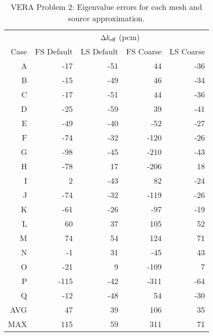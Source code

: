 {{{      \begin{table}[htbp]
        \centering
        \caption{VERA Problem 2: Eigenvalue errors for each mesh and source approximation.\label{tab:LSMOC:Lattice:Eigenvalue}}
        \small
        \begin{tabular}{rrrrr} \toprule
                     & \multicolumn{4}{c}{$\Delta k_{\text{eff}}$ (pcm)}\\\cline{2-5}
            Case     & FS Default & LS Default & FS Coarse & LS Coarse\\\midrule
                A    & -17  &   -51   &  44     & -36\\
                B    & -15  &   -49   &  46     & -34\\
                C    & -17  &   -51   &  44     & -36\\
                D    & -25  &   -59   &  39     & -41\\
                E    & -49  &   -40   &  -52    & -27\\
                F    & -74  &   -32   &  -120   & -26\\
                G    & -98  &   -45   &  -210   & -43\\
                H    & -78  &   17    &  -206   & 18 \\
                I    & 2    &   -43   &  82     & -24\\
                J    & -74  &   -32   &  -119   & -26\\
                K    & -61  &   -26   &  -97    & -19\\
                L    & 60   &   37    &  105    & 52 \\
                M    & 74   &   54    &  124    & 71 \\
                N    & -1   &   31    &  -45    & 43 \\
                O    & -21  &   9     &  -109   & 7  \\
                P    & -115 &   -42   &  -311   & -64\\
                Q    & -12  &   -48   &  54     & -30\\\midrule
                AVG  & 47   &   39    &  106    & 35 \\
                MAX  & 115  &   59    &  311    & 71 \\\bottomrule
        \end{tabular}
      \end{table}

}}}

